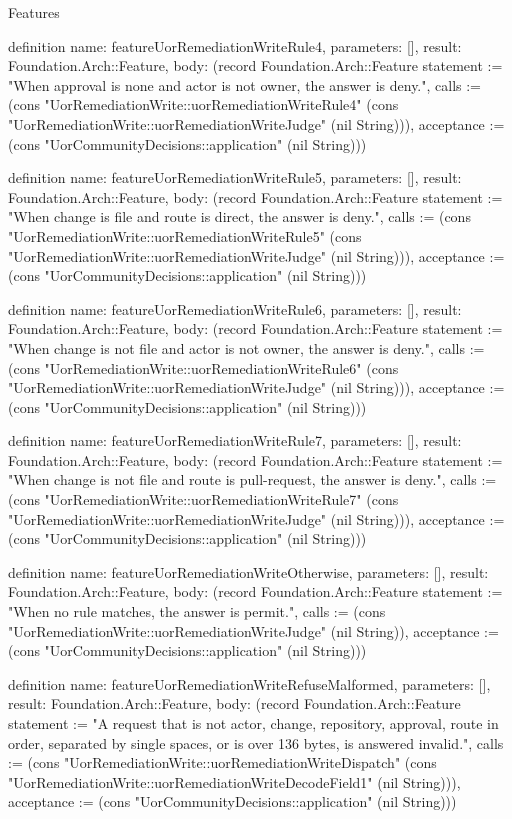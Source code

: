 \begin{lexlean}{Features}
\begin{semanticmodule}
definition{
  name: featureUorRemediationWriteRule4,
  parameters: [],
  result: Foundation.Arch::Feature,
  body: (record Foundation.Arch::Feature {statement := "When approval is none and actor is not owner, the answer is deny.", calls := (cons "UorRemediationWrite::uorRemediationWriteRule4" (cons "UorRemediationWrite::uorRemediationWriteJudge" (nil String))), acceptance := (cons "UorCommunityDecisions::application" (nil String))})
}

definition{
  name: featureUorRemediationWriteRule5,
  parameters: [],
  result: Foundation.Arch::Feature,
  body: (record Foundation.Arch::Feature {statement := "When change is file and route is direct, the answer is deny.", calls := (cons "UorRemediationWrite::uorRemediationWriteRule5" (cons "UorRemediationWrite::uorRemediationWriteJudge" (nil String))), acceptance := (cons "UorCommunityDecisions::application" (nil String))})
}

definition{
  name: featureUorRemediationWriteRule6,
  parameters: [],
  result: Foundation.Arch::Feature,
  body: (record Foundation.Arch::Feature {statement := "When change is not file and actor is not owner, the answer is deny.", calls := (cons "UorRemediationWrite::uorRemediationWriteRule6" (cons "UorRemediationWrite::uorRemediationWriteJudge" (nil String))), acceptance := (cons "UorCommunityDecisions::application" (nil String))})
}

definition{
  name: featureUorRemediationWriteRule7,
  parameters: [],
  result: Foundation.Arch::Feature,
  body: (record Foundation.Arch::Feature {statement := "When change is not file and route is pull-request, the answer is deny.", calls := (cons "UorRemediationWrite::uorRemediationWriteRule7" (cons "UorRemediationWrite::uorRemediationWriteJudge" (nil String))), acceptance := (cons "UorCommunityDecisions::application" (nil String))})
}

definition{
  name: featureUorRemediationWriteOtherwise,
  parameters: [],
  result: Foundation.Arch::Feature,
  body: (record Foundation.Arch::Feature {statement := "When no rule matches, the answer is permit.", calls := (cons "UorRemediationWrite::uorRemediationWriteJudge" (nil String)), acceptance := (cons "UorCommunityDecisions::application" (nil String))})
}

definition{
  name: featureUorRemediationWriteRefuseMalformed,
  parameters: [],
  result: Foundation.Arch::Feature,
  body: (record Foundation.Arch::Feature {statement := "A request that is not actor, change, repository, approval, route in order, separated by single spaces, or is over 136 bytes, is answered invalid.", calls := (cons "UorRemediationWrite::uorRemediationWriteDispatch" (cons "UorRemediationWrite::uorRemediationWriteDecodeField1" (nil String))), acceptance := (cons "UorCommunityDecisions::application" (nil String))})
}


\end{semanticmodule}
\end{lexlean}
